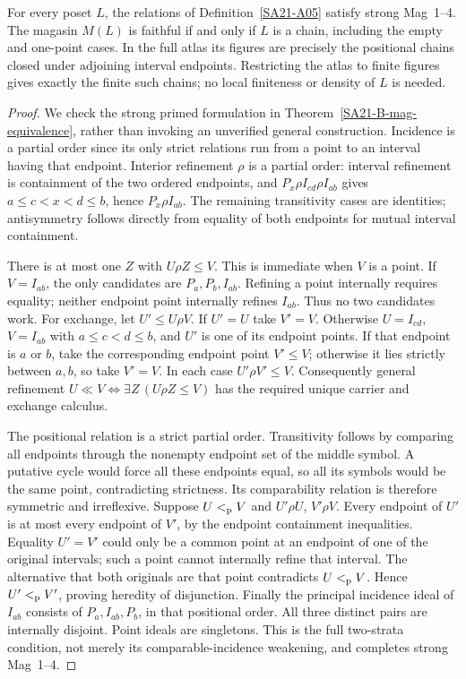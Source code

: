 \begin{proposition}
\label{SA21-A05a}
For every poset $L$, the relations of Definition~\ref{SA21-A05}
satisfy strong Mag~1--4. The magasin $M(L)$ is faithful if and only
if $L$ is a chain, including the empty and one-point cases. In the
full atlas its figures are precisely the positional chains closed
under adjoining interval endpoints. Restricting the atlas to finite
figures gives exactly the finite such chains; no local finiteness
or density of $L$ is needed.
\end{proposition}
\begin{proof}
We check the strong primed formulation in
Theorem~\ref{SA21-B-mag-equivalence}, rather than invoking an
unverified general construction. Incidence is a partial order since
its only strict relations run from a point to an interval having
that endpoint. Interior refinement $\rho$ is a partial order:
interval refinement is containment of the two ordered endpoints,
and $P_x\rho I_{cd}\rho I_{ab}$ gives
$a\le c<x<d\le b$, hence $P_x\rho I_{ab}$. The remaining
transitivity cases are identities; antisymmetry follows directly
from equality of both endpoints for mutual interval containment.

There is at most one $Z$ with $U\rho Z\le V$. This is immediate
when $V$ is a point. If $V=I_{ab}$, the only candidates are
$P_a,P_b,I_{ab}$. Refining a point internally requires equality;
neither endpoint point internally refines $I_{ab}$. Thus no two
candidates work. For exchange, let $U'\le U\rho V$. If $U'=U$
take $V'=V$. Otherwise $U=I_{cd}$, $V=I_{ab}$ with
$a\le c<d\le b$, and $U'$ is one of its endpoint points.
If that endpoint is $a$ or $b$, take the corresponding endpoint
point $V'\le V$; otherwise it lies strictly between $a,b$, so
take $V'=V$. In each case $U'\rho V'\le V$. Consequently
general refinement $U\ll V\iff\exists Z\,(U\rho Z\le V)$
has the required unique carrier and exchange calculus.

The positional relation is a strict partial order. Transitivity
follows by comparing all endpoints through the nonempty endpoint
set of the middle symbol. A putative cycle would force all these
endpoints equal, so all its symbols would be the same point,
contradicting strictness. Its comparability relation is therefore
symmetric and irreflexive. Suppose $U<_{\rm p}V$ and
$U'\rho U$, $V'\rho V$. Every endpoint of $U'$ is at most
every endpoint of $V'$, by the endpoint containment inequalities.
Equality $U'=V'$ could only be a common point at an endpoint of
one of the original intervals; such a point cannot internally
refine that interval. The alternative that both originals are
that point contradicts $U<_{\rm p}V$. Hence
$U'<_{\rm p}V'$, proving heredity of disjunction. Finally the
principal incidence ideal of $I_{ab}$ consists of
$P_a,I_{ab},P_b$, in that positional order. All three distinct
pairs are internally disjoint. Point ideals are singletons.
This is the full two-strata condition, not merely its
comparable-incidence weakening, and completes strong Mag~1--4.


\end{proof}
